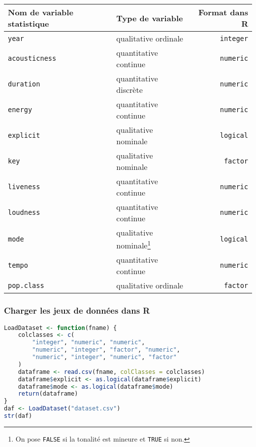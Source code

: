 \documentclass[
  12pt,
  xcolor = usenames,dvipsnames]{article}
\newcommand{\passthrough}[1]{#1}
\begin{document}
\begin{longtable}[]{@{}llr@{}}
\toprule
Nom de variable statistique & Type de variable & Format dans R \\
\midrule
\endhead
\passthrough{\lstinline!year!} & qualitative ordinale & \passthrough{\lstinline!integer!} \\
\passthrough{\lstinline!acousticness!} & quantitative continue & \passthrough{\lstinline!numeric!} \\
\passthrough{\lstinline!duration!} & quantitative discrète & \passthrough{\lstinline!numeric!} \\
\passthrough{\lstinline!energy!} & quantitative continue & \passthrough{\lstinline!numeric!} \\
\passthrough{\lstinline!explicit!} & qualitative nominale & \passthrough{\lstinline!logical!} \\
\passthrough{\lstinline!key!} & qualitative nominale & \passthrough{\lstinline!factor!} \\
\passthrough{\lstinline!liveness!} & quantitative continue & \passthrough{\lstinline!numeric!} \\
\passthrough{\lstinline!loudness!} & quantitative continue & \passthrough{\lstinline!numeric!} \\
\passthrough{\lstinline!mode!} & qualitative nominale\footnote{On pose \passthrough{\lstinline!FALSE!} si la tonalité est mineure et \passthrough{\lstinline!TRUE!} si non.} & \passthrough{\lstinline!logical!} \\
\passthrough{\lstinline!tempo!} & quantitative continue & \passthrough{\lstinline!numeric!} \\
\passthrough{\lstinline!pop.class!} & qualitative ordinale & \passthrough{\lstinline!factor!} \\
\bottomrule
\end{longtable}

\hypertarget{charger-les-jeux-de-donnuxe9es-dans-r}{%
\subsubsection{Charger les jeux de données dans R}\label{charger-les-jeux-de-donnuxe9es-dans-r}}

\begin{lstlisting}[language=R]
LoadDataset <- function(fname) {
    colclasses <- c(
        "integer", "numeric", "numeric",
        "numeric", "integer", "factor", "numeric",
        "numeric", "integer", "numeric", "factor"
    )
    dataframe <- read.csv(fname, colClasses = colclasses)
    dataframe$explicit <- as.logical(dataframe$explicit)
    dataframe$mode <- as.logical(dataframe$mode)
    return(dataframe)
}
daf <- LoadDataset("dataset.csv")
str(daf)
\end{lstlisting}
\end{document}
